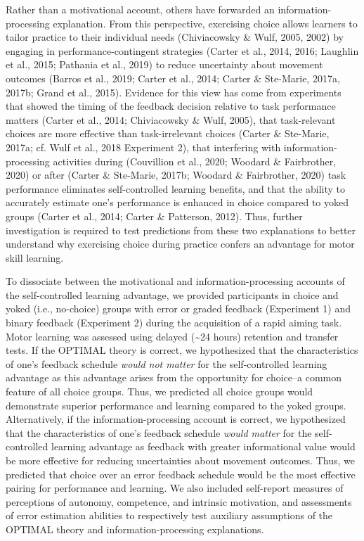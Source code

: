 \documentclass[
  man, donotrepeattitle,floatsintext]{apa7}
\begin{document}
Rather than a motivational account, others have forwarded an information-processing explanation. From this perspective, exercising choice allows learners to tailor practice to their individual needs (Chiviacowsky \& Wulf, 2005, 2002) by engaging in performance-contingent strategies (Carter et al., 2014, 2016; Laughlin et al., 2015; Pathania et al., 2019) to reduce uncertainty about movement outcomes (Barros et al., 2019; Carter et al., 2014; Carter \& Ste-Marie, 2017a, 2017b; Grand et al., 2015). Evidence for this view has come from experiments that showed the timing of the feedback decision relative to task performance matters (Carter et al., 2014; Chiviacowsky \& Wulf, 2005), that task-relevant choices are more effective than task-irrelevant choices (Carter \& Ste-Marie, 2017a; cf. Wulf et al., 2018 Experiment 2), that interfering with information-processing activities during (Couvillion et al., 2020; Woodard \& Fairbrother, 2020) or after (Carter \& Ste-Marie, 2017b; Woodard \& Fairbrother, 2020) task performance eliminates self-controlled learning benefits, and that the ability to accurately estimate one's performance is enhanced in choice compared to yoked groups (Carter et al., 2014; Carter \& Patterson, 2012). Thus, further investigation is required to test predictions from these two explanations to better understand why exercising choice during practice confers an advantage for motor skill learning.

To dissociate between the motivational and information-processing accounts of the self-controlled learning advantage, we provided participants in choice and yoked (i.e., no-choice) groups with error or graded feedback (Experiment 1) and binary feedback (Experiment 2) during the acquisition of a rapid aiming task. Motor learning was assessed using delayed (\textasciitilde24 hours) retention and transfer tests. If the OPTIMAL theory is correct, we hypothesized that the characteristics of one's feedback schedule \emph{would not matter} for the self-controlled learning advantage as this advantage arises from the opportunity for choice--a common feature of all choice groups. Thus, we predicted all choice groups would demonstrate superior performance and learning compared to the yoked groups. Alternatively, if the information-processing account is correct, we hypothesized that the characteristics of one's feedback schedule \emph{would matter} for the self-controlled learning advantage as feedback with greater informational value would be more effective for reducing uncertainties about movement outcomes. Thus, we predicted that choice over an error feedback schedule would be the most effective pairing for performance and learning. We also included self-report measures of perceptions of autonomy, competence, and intrinsic motivation, and assessments of error estimation abilities to respectively test auxiliary assumptions of the OPTIMAL theory and information-processing explanations.
\end{document}
